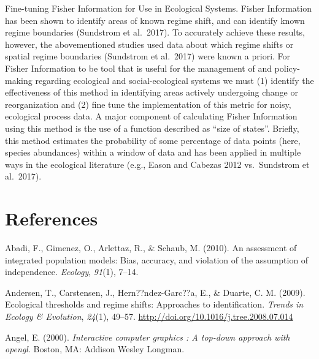 \documentclass[12pt,twoside,openany]{reedthesis}
\begin{document}
Fine-tuning Fisher Information for Use in Ecological Systems. Fisher Information has been shown to identify areas of known regime shift, and can identify known regime boundaries (Sundstrom et al.~2017). To accurately achieve these results, however, the abovementioned studies used data about which regime shifts or spatial regime boundaries (Sundstrom et al.~2017) were known a priori. For Fisher Information to be tool that is useful for the management of and policy-making regarding ecological and social-ecological systems we must (1) identify the effectiveness of this method in identifying areas actively undergoing change or reorganization and (2) fine tune the implementation of this metric for noisy, ecological process data.
A major component of calculating Fisher Information using this method is the use of a function described as ``size of states''. Briefly, this method estimates the probability of some percentage of data points (here, species abundances) within a window of data and has been applied in multiple ways in the ecological literature (e.g., Eason and Cabezas 2012 vs.~Sundstrom et al.~2017).

\backmatter

\hypertarget{references}{%
\chapter*{References}\label{references}}


\noindent

\setlength{\parindent}{-0.20in}
\setlength{\leftskip}{0.20in}
\setlength{\parskip}{8pt}

\hypertarget{refs}{}
\leavevmode\hypertarget{ref-abadi2010assessment}{}%
Abadi, F., Gimenez, O., Arlettaz, R., \& Schaub, M. (2010). An assessment of integrated population models: Bias, accuracy, and violation of the assumption of independence. \emph{Ecology}, \emph{91}(1), 7--14.

\leavevmode\hypertarget{ref-andersen_ecological_2009}{}%
Andersen, T., Carstensen, J., Hern??ndez-Garc??a, E., \& Duarte, C. M. (2009). Ecological thresholds and regime shifts: Approaches to identification. \emph{Trends in Ecology \& Evolution}, \emph{24}(1), 49--57. \url{http://doi.org/10.1016/j.tree.2008.07.014}

\leavevmode\hypertarget{ref-angel2000}{}%
Angel, E. (2000). \emph{Interactive computer graphics : A top-down approach with opengl}. Boston, MA: Addison Wesley Longman.
\end{document}
